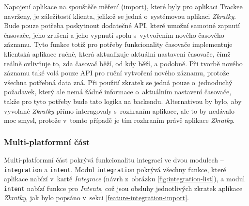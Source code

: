 Napojení aplikace na spouštěče měření (import), které byly pro aplikaci Trackee navrženy, je záležitostí klienta, jelikož se jedná o~systémovou aplikaci \emph{Zkratky}. Bude pouze potřeba poskytnout dodatečné API, které umožní samotné zapnutí časovače, jeho zrušení a jeho vypnutí spolu s~vytvořením nového časového záznamu. Tyto funkce totiž pro potřeby funkcionality časovače implementuje klientská aplikace ručně, která aktualizuje aktuální nastavení časovače, čímž reálně ovlivňuje to, zda časovač běží, od kdy běží, a podobně. Při tvorbě nového záznamu také volá pouze API pro ruční vytvoření nového záznamu, protože všechna potřebná data zná. Při použití zkratek se jedná pouze o~jednoduchý požadavek, který ale nemá žádné informace o~aktuálním nastavení časovače, takže pro tyto potřeby bude tato logika na backendu. Alternativou by bylo, aby vyvolané \emph{Zkratky} přímo interagovaly s~rozhraním aplikace, ale to by nedávalo moc smysl, protože v~tomto případě je tím rozhraním právě aplikace \emph{Zkratky}.

\subsubsection{Multi-platformní část}

Multi-platformní část pokrývá funkcionalitu integrací ve dvou modulech – \texttt{integration} a \texttt{intent}. Modul \texttt{integration} pokrývá všechny funkce, které aplikace nabízí v~kartě \emph{Integrace} (návrh z~obrázku \ref{fig:integration-list}), a modul \texttt{intent} nabízí funkce pro \emph{Intents}, což jsou obsluhy jednotlivých zkratek aplikace \emph{Zkratky}, jak bylo popsáno v~sekci \ref{feature-integration-import}.

